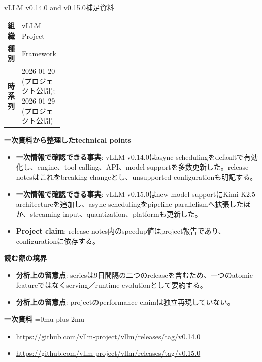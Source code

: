 \begin{technicalnote}{vLLM v0.14.0 and v0.15.0}{補足資料}
\begingroup
\begin{tabularx}{\linewidth}{@{}>{\bfseries}p{0.22\linewidth}X@{}}
組織 & vLLM Project \\
種別 & Framework \\
時系列 & 2026-01-20 (プロジェクト公開); 2026-01-29 (プロジェクト公開) \\
\end{tabularx}
\smallskip
{\bfseries 一次資料から整理したtechnical points}
\begin{itemize}[leftmargin=1.5em,itemsep=0.35em]
\item \textbf{一次情報で確認できる事実}: vLLM v0.14.0はasync schedulingをdefaultで有効化し、engine、tool-calling、API、model supportを多数更新した。release notesはこれをbreaking changeとし、unsupported configurationも明記する。
\item \textbf{一次情報で確認できる事実}: vLLM v0.15.0はnew model supportにKimi-K2.5 architectureを追加し、async schedulingをpipeline parallelismへ拡張したほか、streaming input、quantization、platformも更新した。
\item \textbf{Project claim}: release notes内のspeedup値はproject報告であり、configurationに依存する。
\end{itemize}
\begin{minipage}{\linewidth}
{\bfseries 読む際の境界}
\begin{itemize}[leftmargin=1.5em,itemsep=0.35em]
\item \textbf{分析上の留意点}: seriesは9日間隔の二つのreleaseを含むため、一つのatomic featureではなくserving／runtime evolutionとして要約する。
\item \textbf{分析上の留意点}: projectのperformance claimは独立再現していない。
\end{itemize}
\begin{samepage}
{\bfseries 一次資料}
\begingroup\sloppy
\Urlmuskip=0mu plus 2mu\relax
\begin{itemize}[leftmargin=1.5em,itemsep=0.25em]
\item {\scriptsize\url{https://github.com/vllm-project/vllm/releases/tag/v0.14.0}}
\item {\scriptsize\url{https://github.com/vllm-project/vllm/releases/tag/v0.15.0}}
\end{itemize}
\endgroup
\end{samepage}
\end{minipage}
\endgroup
\end{technicalnote}
\medskip
